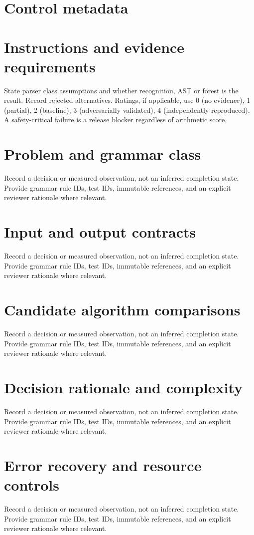 \documentclass[11pt,letterpaper]{article}
\begin{document}
\makedoctitle\makedocsummary
\tableofcontents\clearpage
\section{Control metadata}
\section{Instructions and evidence requirements}
State parser class assumptions and whether recognition, AST or forest is the result. Record rejected alternatives. Ratings, if applicable, use 0 (no evidence), 1 (partial), 2 (baseline), 3 (adversarially validated), 4 (independently reproduced). A safety-critical failure is a release blocker regardless of arithmetic score.
\section{Problem and grammar class}
Record a decision or measured observation, not an inferred completion state. Provide grammar rule IDs, test IDs, immutable references, and an explicit reviewer rationale where relevant.
\section{Input and output contracts}
Record a decision or measured observation, not an inferred completion state. Provide grammar rule IDs, test IDs, immutable references, and an explicit reviewer rationale where relevant.
\section{Candidate algorithm comparisons}
Record a decision or measured observation, not an inferred completion state. Provide grammar rule IDs, test IDs, immutable references, and an explicit reviewer rationale where relevant.
\section{Decision rationale and complexity}
Record a decision or measured observation, not an inferred completion state. Provide grammar rule IDs, test IDs, immutable references, and an explicit reviewer rationale where relevant.
\section{Error recovery and resource controls}
Record a decision or measured observation, not an inferred completion state. Provide grammar rule IDs, test IDs, immutable references, and an explicit reviewer rationale where relevant.
\end{document}
